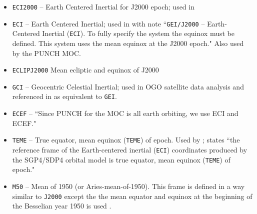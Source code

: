 \documentclass[draft]{agujournal2019}
\begin{document}
\begin{itemize}
    \item \texttt{ECI2000} -- Earth Centered Inertial for J2000 epoch; used in \cite{Niehof2022}

    \item \texttt{ECI} -- Earth Centered Inertial; used in  with note ``\texttt{GEI/J2000} – Earth-Centered Inertial (\texttt{ECI}). To fully specify the system the equinox must be defined. This system uses the mean equinox at the J2000 epoch." Also used by the PUNCH MOC.

    \item \texttt{ECLIPJ2000} Mean ecliptic and equinox of J2000 \cite{NAIFFrames2025}

    \item \texttt{GCI} -- Geocentric Celestial Inertial; used in OGO satellite data analysis \cite{NTRS1970} and referenced in  as equivalent to \texttt{GEI}.

    \item \texttt{ECEF} -- ``Since PUNCH for the MOC is all earth orbiting, we use ECI and ECEF."
     
    \item \texttt{TEME} -- True equator, mean equinox (\texttt{TEME}) of epoch. Used by ;  states ``the reference frame of the Earth-centered inertial (\texttt{ECI}) coordinates produced by the SGP4/SDP4 orbital model is true equator, mean equinox (\texttt{TEME}) of epoch."


    \item \texttt{M50} -- Mean of 1950 (or Aries-mean-of-1950). This frame is defined in a way similar to \texttt{J2000} except the the mean equator and equinox at the beginning of the Besselian year 1950 is used \cite{NASA1965}.
\end{itemize}

\end{document}

